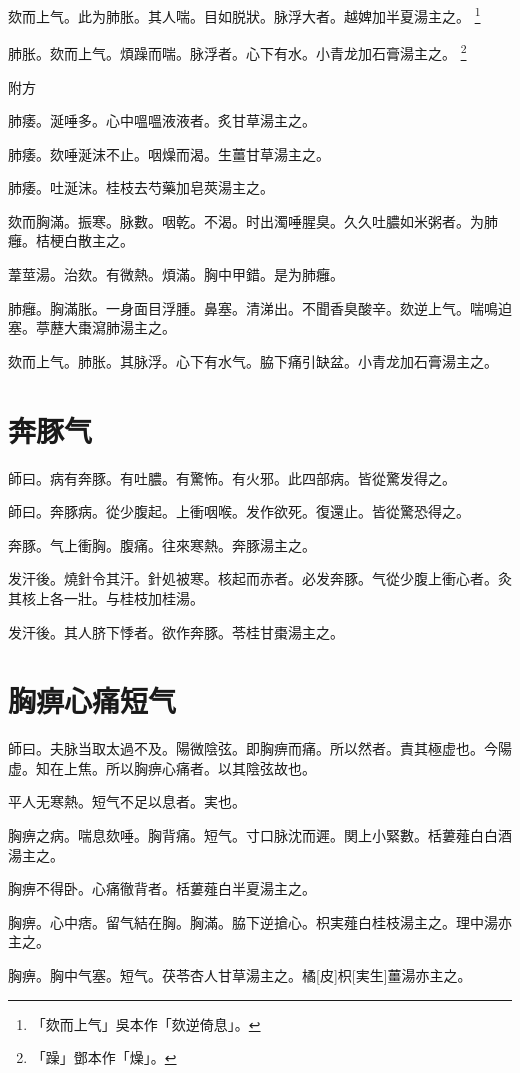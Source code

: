 \documentclass[12pt,oneside,UTF8,b5paper]{ctexbook}她她她她她她她
\begin{document}
欬而上气。此为肺胀。其人喘。目如脱狀。脉浮大者。越婢加半夏湯主之。
	\footnote{「欬而上气」吳本作「欬逆倚息」。}

肺胀。欬而上气。煩躁而喘。脉浮者。心下有水。小青龙加石膏湯主之。
	\footnote{「躁」鄧本作「燥」。}

附方

肺痿。涎唾多。心中嗢嗢液液者。炙甘草湯主之。

肺痿。欬唾涎沫不止。咽燥而渴。生薑甘草湯主之。

肺痿。吐涎沫。桂枝去芍藥加皂莢湯主之。

欬而胸滿。振寒。脉數。咽乾。不渴。时出濁唾腥臭。久久吐膿如米粥者。为肺癰。桔梗白散主之。

葦莖湯。治欬。有微熱。煩滿。胸中甲錯。是为肺癰。

肺癰。胸滿胀。一身面目浮腫。鼻塞。清涕出。不聞香臭酸辛。欬逆上气。喘鳴迫塞。葶藶大棗瀉肺湯主之。

欬而上气。肺胀。其脉浮。心下有水气。脇下痛引缺盆。小青龙加石膏湯主之。

\chapter{奔豚气}

師曰。病有奔豚。有吐膿。有驚怖。有火邪。此四部病。皆從驚发得之。

師曰。奔豚病。從少腹起。上衝咽喉。发作欲死。復還止。皆從驚恐得之。

奔豚。气上衝胸。腹痛。往來寒熱。奔豚湯主之。

发汗後。燒針令其汗。針処被寒。核起而赤者。必发奔豚。气從少腹上衝心者。灸其核上各一壯。与桂枝加桂湯。

发汗後。其人脐下悸者。欲作奔豚。苓桂甘棗湯主之。

\chapter{胸痹心痛短气}

師曰。夫脉当取太過不及。陽微陰弦。即胸痹而痛。所以然者。責其極虚也。今陽虚。知在上焦。所以胸痹心痛者。以其陰弦故也。

平人无寒熱。短气不足以息者。実也。

胸痹之病。喘息欬唾。胸背痛。短气。寸口脉沈而遲。関上小緊數。栝蔞薤白白酒湯主之。

胸痹不得卧。心痛徹背者。栝蔞薤白半夏湯主之。

胸痹。心中痞。留气結在胸。胸滿。脇下逆搶心。枳実薤白桂枝湯主之。理中湯亦主之。

胸痹。胸中气塞。短气。茯苓杏人甘草湯主之。橘[皮]枳[実生]薑湯亦主之。
\end{document}
